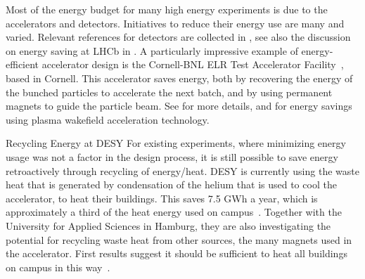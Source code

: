 \documentclass[../SustainableHEP.tex]{subfiles}
\begin{document}
Most of the energy budget for many high energy experiments is due to the accelerators and detectors. Initiatives to reduce their energy use are many and varied. Relevant references for detectors are collected in , see also the discussion on energy saving at LHCb in .  A particularly impressive example of energy-efficient accelerator design is the Cornell-BNL ELR Test Accelerator Facility~\cite{Bartnik:2020pos}, based in Cornell. This accelerator saves energy, both by recovering the energy of the bunched particles to accelerate the next batch, and by using permanent magnets to guide the particle beam.  See  for more details, and  for energy savings using plasma wakefield acceleration technology.


\begin{bestpractice}{Recycling Energy at DESY}%
   For existing experiments, where minimizing energy usage was not a factor in the design process, it is still possible to save energy retroactively through recycling of energy/heat. DESY is currently using the waste heat that is generated by condensation of the helium that is used to cool the accelerator, to heat their buildings. This saves 7.5 GWh a year, which is approximately a third of the heat energy used on campus~\cite{DESY}. Together with the University for Applied Sciences in Hamburg, they are also investigating the potential for recycling waste heat from other sources, \eg the many magnets used in the accelerator. First results suggest it should be sufficient to heat all buildings on campus in this way~\cite{DESYsustainableReport2022}.
\end{bestpractice}
\end{document}
